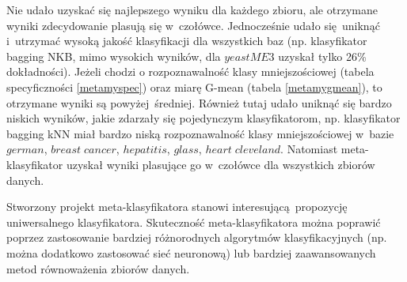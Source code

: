 Nie udało uzyskać się najlepszego wyniku dla każdego zbioru, ale otrzymane wyniki zdecydowanie plasują się w~czołówce. Jednocześnie udało się uniknąć i~utrzymać wysoką jakość klasyfikacji dla wszystkich baz (np. klasyfikator bagging NKB, mimo wysokich wyników, dla $yeastME3$ uzyskał tylko 26\% dokładności). Jeżeli chodzi o rozpoznawalność klasy mniejszościowej (tabela specyficzności \ref{metamyspec}) oraz miarę G-mean (tabela \ref{metamygmean}), to otrzymane wyniki są powyżej średniej. Również tutaj udało uniknąć się bardzo niskich wyników, jakie zdarzały się pojedynczym klasyfikatorom, np. klasyfikator bagging kNN miał bardzo niską rozpoznawalność klasy mniejszościowej w~bazie $german$, $breast\; cancer$, $hepatitis$, $glass$, $heart\; cleveland$. Natomiast meta-klasyfikator uzyskał wyniki plasujące go w~czołówce dla wszystkich zbiorów danych. \par
Stworzony projekt meta-klasyfikatora stanowi interesującą propozycję uniwersalnego klasyfikatora. Skuteczność meta-klasyfikatora można poprawić poprzez zastosowanie bardziej różnorodnych algorytmów klasyfikacyjnych (np. można dodatkowo zastosować sieć neuronową) lub bardziej zaawansowanych metod równoważenia zbiorów danych.

	

